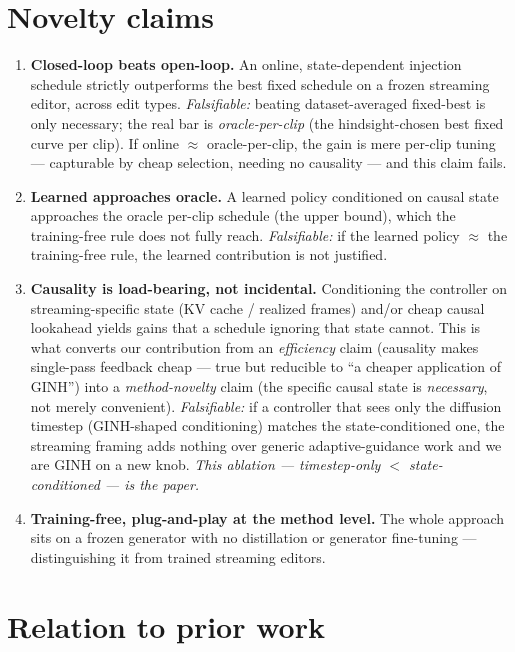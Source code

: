 \documentclass{article}
\begin{document}
\section{Novelty claims}

\begin{enumerate}
  \item \textbf{Closed-loop beats open-loop.} An online, state-dependent injection schedule
        strictly outperforms the best fixed schedule on a frozen streaming editor, across edit
        types. \emph{Falsifiable:} beating dataset-averaged fixed-best is only necessary; the
        real bar is \emph{oracle-per-clip} (the hindsight-chosen best fixed curve per clip). If
        online $\approx$ oracle-per-clip, the gain is mere per-clip tuning --- capturable by
        cheap selection, needing no causality --- and this claim fails.
  \item \textbf{Learned approaches oracle.} A learned policy conditioned on causal state
        approaches the oracle per-clip schedule (the upper bound), which the training-free rule
        does not fully reach. \emph{Falsifiable:} if the learned policy $\approx$ the
        training-free rule, the learned contribution is not justified.
  \item \textbf{Causality is load-bearing, not incidental.} Conditioning the controller on
        streaming-specific state (KV cache / realized frames) and/or cheap causal lookahead
        yields gains that a schedule ignoring that state cannot. This is what converts our
        contribution from an \emph{efficiency} claim (causality makes single-pass feedback
        cheap --- true but reducible to ``a cheaper application of GINH'') into a
        \emph{method-novelty} claim (the specific causal state is \emph{necessary}, not merely
        convenient). \emph{Falsifiable:} if a controller that sees only the diffusion timestep
        (GINH-shaped conditioning) matches the state-conditioned one, the streaming framing adds
        nothing over generic adaptive-guidance work and we are GINH on a new knob. \emph{This
        ablation --- timestep-only $<$ state-conditioned --- is the paper.}
  \item \textbf{Training-free, plug-and-play at the method level.} The whole approach sits on a
        frozen generator with no distillation or generator fine-tuning --- distinguishing it
        from trained streaming editors.
\end{enumerate}

\section{Relation to prior work}
\end{document}
